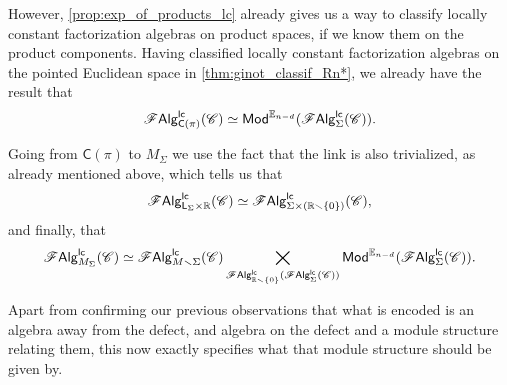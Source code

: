 \documentclass[../text]{subfiles}
\begin{document}
However, \cref{prop:exp_of_products_lc} already gives us a way to classify locally constant factorization algebras on product spaces, if we know them on the product components. Having classified locally constant factorization algebras on the pointed Euclidean space in \cref{thm:ginot_classif_Rn*}, we already have the result that
%
\begin{equation}
    \mathscr{F} \mathsf{Alg}^{\mathsf{lc}}_{\mathsf{C}(\pi)} (\mathscr{C}) \simeq \mathsf{Mod}^{\mathbb{E}_{n-d}} (\mathscr{F} \mathsf{Alg}^{\mathsf{lc}}_{\Sigma} (\mathscr{C})).
\end{equation}

Going from $\mathsf{C}(\pi)$ to $M_{\Sigma}$ we use the fact that the link is also trivialized, as already mentioned above, which tells us that
%
\begin{equation}
    \mathscr{F} \mathsf{Alg}^{\mathsf{lc}}_{\mathsf{L}_{\Sigma} \times \mathbb{R}} (\mathscr{C}) \simeq \mathscr{F} \mathsf{Alg}^{\mathsf{lc}}_{\Sigma \times (\mathbb{R} \smallsetminus \{0\})} (\mathscr{C}),
\end{equation}
%
and finally, that
% 
\begin{equation}
    \mathscr{F} \mathsf{Alg}^{\mathsf{lc}}_{M_\Sigma} (\mathscr{C}) \simeq \mathscr{F} \mathsf{Alg}^{\mathsf{lc}}_{M \smallsetminus \Sigma} (\mathscr{C}) \bigtimes_{\mathscr{F} \mathsf{Alg}^{\mathsf{lc}}_{\mathbb{R} \smallsetminus \{0\}} (\mathscr{F} \mathsf{Alg}^{\mathsf{lc}}_{\Sigma} (\mathscr{C}))} \mathsf{Mod}^{\mathbb{E}_{n-d}} (\mathscr{F} \mathsf{Alg}^{\mathsf{lc}}_{\Sigma} (\mathscr{C})).
\end{equation}

Apart from confirming our previous observations that what is encoded is an algebra away from the defect, and algebra on the defect and a module structure relating them, this now exactly specifies what that module structure should be given by.



\end{document}
